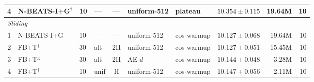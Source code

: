 \begin{table}[h]
{\begin{tabular}{@{}clllcllrrr@{}}
    4 & N-BEATS-I+G$^{\dag}$     & 10 & ---         & --- & uniform-512 & plateau & $10.354 \pm 0.115$          & 19.64M & 10 \\
    \midrule
    \multicolumn{9}{l}{\textit{Sliding}} \\
    \midrule
    1 & N-BEATS-I+G              & 10 & --- & --- & uniform-512 & cos-warmup & $\mathbf{10.127 \pm 0.068}$ & 19.64M & 10 \\
    2 & FB+T$^{\ddag}$           & 30 & alt & 2H  & uniform-512 & cos-warmup & $10.127 \pm 0.051$          & 15.45M & 10 \\
    3 & FB+T$^{\mathrm{g}}$      & 30 & alt & 2H  & AE-$d$      & cos-warmup & $10.144 \pm 0.048$          & 3.28M  & 10 \\
    4 & FB+T$^{\ddag}$           & 10 & unif & H  & uniform-512 & cos-warmup & $10.147 \pm 0.056$          & 2.11M  & 10 \\
    \bottomrule
  \end{tabular}}
\end{table}